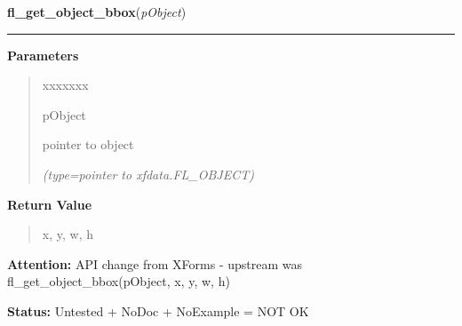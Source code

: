 \hspace{.8\funcindent}\begin{boxedminipage}{\funcwidth}

    \raggedright \textbf{fl\_get\_object\_bbox}(\textit{pObject})

    \vspace{-1.5ex}

    \rule{\textwidth}{0.5\fboxrule}
\setlength{\parskip}{2ex}
\setlength{\parskip}{1ex}
      \textbf{Parameters}
      \vspace{-1ex}

      \begin{quote}
        \begin{Ventry}{xxxxxxx}

          \item[pObject]

          pointer to object

            {\it (type=pointer to xfdata.FL\_OBJECT)}

        \end{Ventry}

      \end{quote}

      \textbf{Return Value}
    \vspace{-1ex}

      \begin{quote}
      x, y, w, h

      \end{quote}

\textbf{Attention:} API change from XForms - upstream was fl\_get\_object\_bbox(pObject, x, y, 
w, h)



\textbf{Status:} Untested + NoDoc + NoExample = NOT OK



    \end{boxedminipage}

    \label{xformslib:library:fl_get_object_bbox}

    \vspace{0.5ex}

